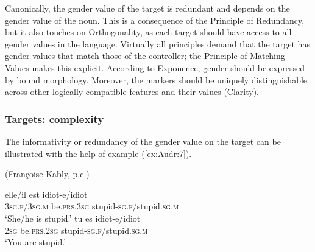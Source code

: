 \documentclass[output=collectionpaper]{langsci/langscibook}
\begin{document}
Canonically, the gender value of the target is redundant and depends on the gender value of the noun. This is a consequence of the Principle of Redundancy, but it also touches on Orthogonality, as each target should have access to all gender values in the language. Virtually all principles demand that the target has gender values that match those of the controller; the Principle of Matching Values makes this explicit. According to Exponence, gender should be expressed by bound morphology. Moreover, the markers should be uniquely distinguishable across other logically compatible features and their values (Clarity).

\subsubsection{Targets: complexity}
\label{sec:Audr:3.3.2}

The informativity or redundancy of the gender value on the target can be illustrated with the help of example (\ref{ex:Audr:7}).

\ea
\label{ex:Audr:7}
 (Françoise Kably, p.c.)\\
\begin{xlist}
\ex
\gll elle/il est idiot-e/idiot\\
     \textsc{3sg.f/3sg.m} be\textsc{.prs.3sg} stupid\textsc{{}-sg.f/}stupid\textsc{.sg.m}\\
\glt `She/he is stupid.'
\ex
\gll tu es idiot-e/idiot\\
     \textsc{2sg} be\textsc{.prs.2sg} stupid\textsc{{}-sg.f/}stupid\textsc{.sg.m}\\
\glt `You are stupid.'
\end{xlist}
\z
\end{document}
